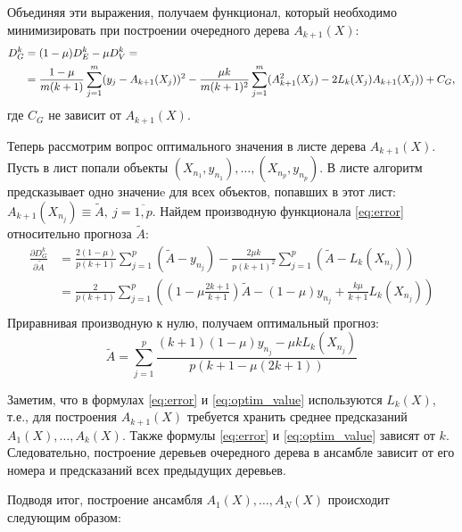 \documentclass{article}
\begin{document}
Объединяя эти выражения, получаем функционал, который необходимо минимизировать при построении очередного дерева $A_{k+1}(X)$:
\begin{align} \label{eq:error}
  D_G^k &= (1 - \mu) D_E^k - \mu D_V^k = \notag \\ 
  &= \frac{1-\mu}{m(k+1)} \sum_{j=1}^{m}(y_j - A_{k+1}(X_j))^2 
  -\frac{\mu k}{m(k+1)^2} \sum_{j=1}^{m} (A_{k+1}^2(X_j) - 2L_k(X_j)A_{k+1}(X_j)) + C_G, 
\end{align} 
где $C_G$ не зависит от $A_{k+1}(X)$.

Теперь рассмотрим вопрос оптимального значения в листе дерева $A_{k+1}(X)$. Пусть в лист попали объекты $(X_{n_1}, y_{n_1}), \dots, (X_{n_p}, y_{n_p})$. В листе алгоритм предсказывает одно значениe для всех объектов, попавших в этот лист: $A_{k+1}(X_{n_j}) \equiv \tilde{A}, \ j = \overline{1, p}$.
Найдем производную функционала \eqref{eq:error} относительно прогноза $\tilde{A}$:
\begin{align*}
  \frac{\partial D_G^k}{\partial \tilde{A}} &= \frac{2(1-\mu)}{p(k+1)} \sum_{j=1}^{p}(\tilde{A} - y_{n_j}) -
  \frac{2\mu k}{p(k+1)^2} \sum_{j=1}^{p}(\tilde{A} - L_k(X_{n_j})) \\
  &= \frac{2}{p(k+1)} \sum_{j=1}^{p} \left((1 - \mu \frac{2k + 1}{k+1})\tilde{A}
  - (1 - \mu)y_{n_j} + \frac{k \mu}{k+1}L_k(X_{n_j}) \right) \\
\end{align*}
Приравнивая производную к нулю, получаем оптимальный прогноз:
\begin{equation} \label{eq:optim_value}
  \tilde{A} = \sum_{j=1}^{p} \frac{(k+1)(1-\mu)y_{n_j} -\mu k L_k(X_{n_j})}{p(k + 1 - \mu (2k + 1))}
\end{equation}

Заметим, что в формулах \eqref{eq:error} и \eqref{eq:optim_value} используются $L_k(X)$, т.е., для построения $A_{k+1}(X)$ требуется хранить среднее предсказаний $A_1(X), \dots, A_{k}(X)$. Также формулы \eqref{eq:error} и \eqref{eq:optim_value} зависят от $k$. Следовательно, построение деревьев очередного дерева в ансамбле зависит от его номера и предсказаний всех предыдущих деревьев.

Подводя итог, построение ансамбля $A_1(X), \dots, A_N(X)$ происходит следующим образом:
\end{document}

